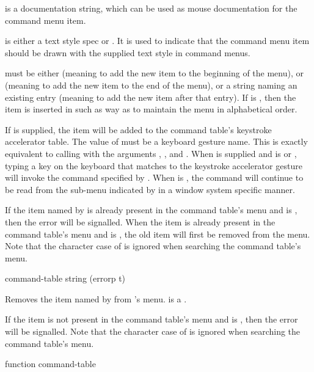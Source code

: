  is a documentation string, which can be used as mouse
documentation for the command menu item.

 is either a text style spec or .  It is used to
indicate that the command menu item should be drawn with the supplied text style
in command menus.

 must be either  (meaning to add the new item to the
beginning of the menu),  or  (meaning to add the new item to
the end of the menu), or a string naming an existing entry (meaning to add the
new item after that entry).  If  is , then the item is
inserted in such as way as to maintain the menu in alphabetical order.

If  is supplied, the item will be added to the command table's
keystroke accelerator table.  The value of  must be a keyboard
gesture name.  This is exactly equivalent to calling
 with the arguments ,
,  and .  When  is supplied
and  is  or , typing a key on the keyboard
that matches to the keystroke accelerator gesture will invoke the command
specified by .  When  is , the command will
continue to be read from the sub-menu indicated by  in a window
system specific manner.

If the item named by  is already present in the command table's menu
and  is , then the  error
will be signalled.  When the item is already present in the command table's menu
and  is , the old item will first be removed from the
menu.  Note that the character case of  is ignored when searching
the command table's menu.


 {command-table string \key (errorp t)}

Removes the item named by  from 's menu.
 is a .

If the item is not present in the command table's menu and  is
, then the  error will be signalled.  Note
that the character case of  is ignored when searching the command
table's menu.

 {function command-table}

